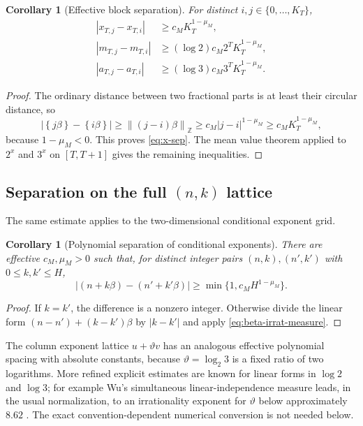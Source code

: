 \documentclass[11pt,oneside]{article}
\newtheorem{corollary}[theorem]{Corollary}
\theoremstyle{definition}
\theoremstyle{remark}
\newcommand{\Z}{\mathbb Z}
\newcommand{\fract}[1]{\left\{#1\right\}}
\newcommand{\distZ}[1]{\left\lVert #1\right\rVert_{\Z}}
\begin{document}
\begin{corollary}[Effective block separation]\label{cor:block-separation}
For distinct $i,j\in\{0,\ldots,K_T\}$,
\begin{align}
 |x_{T,j}-x_{T,i}|&\ge c_MK_T^{1-\mu_M},\label{eq:x-sep}\\
 |m_{T,j}-m_{T,i}|&\ge (\log2)c_M2^T K_T^{1-\mu_M},\label{eq:m-sep}\\
 |a_{T,j}-a_{T,i}|&\ge (\log3)c_M3^T K_T^{1-\mu_M}.
 \label{eq:a-sep}
\end{align}
\end{corollary}

\begin{proof}
The ordinary distance between two fractional parts is at least their circular distance, so
\[
 |\fract{j\beta}-\fract{i\beta}|
 \ge\distZ{(j-i)\beta}
 \ge c_M|j-i|^{1-\mu_M}
 \ge c_MK_T^{1-\mu_M},
\]
because $1-\mu_M<0$.  This proves \eqref{eq:x-sep}.  The mean value theorem applied to $2^x$
and $3^x$ on $[T,T+1]$ gives the remaining inequalities.
\end{proof}

\subsection{Separation on the full \texorpdfstring{$(n,k)$}{(n,k)} lattice}

The same estimate applies to the two-dimensional conditional exponent grid.

\begin{corollary}[Polynomial separation of conditional exponents]\label{cor:grid-separation}
There are effective $c_M,\mu_M>0$ such that, for distinct integer pairs
$(n,k),(n',k')$ with $0\le k,k'\le H$,
\[
  |(n+k\beta)-(n'+k'\beta)|
  \ge \min\{1,c_MH^{1-\mu_M}\}.
\]
\end{corollary}

\begin{proof}
If $k=k'$, the difference is a nonzero integer.  Otherwise divide the linear form
$(n-n')+(k-k')\beta$ by $|k-k'|$ and apply
\eqref{eq:beta-irrat-measure}.
\end{proof}

The column exponent lattice $u+\vartheta v$ has an analogous effective polynomial spacing
with absolute constants, because $\vartheta=\log_2 3$ is a fixed ratio of two logarithms.
More refined explicit estimates are known for linear forms in $\log2$ and $\log3$; for
example Wu's simultaneous linear-independence measure leads, in the usual normalization, to
an irrationality exponent for $\vartheta$ below approximately $8.62$
\cite{Wu2003}.  The exact convention-dependent numerical conversion is not needed below.
\end{document}
